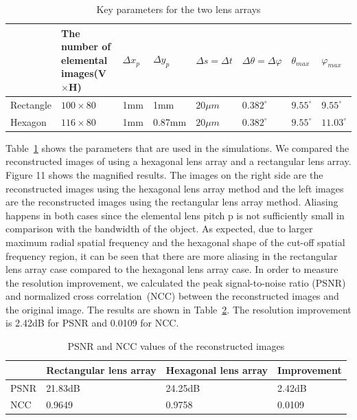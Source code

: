 \documentclass[10pt,letterpaper]{article}
\begin{document}
\begin{table}[htbp]
\centering\caption{ Key parameters for the two lens arrays}
\begin{tabular}{p{0.5in}|p{1.2in}|p{0.3in}|p{0.4in}|p{0.45in}|p{0.55in}|p{0.3in}|p{0.3in}} 
\hline 
  & The number of elemental images(V$\times$H) & $\Delta x_p$ & $\Delta y_p$ & $\Delta s=\Delta t$ & $\Delta\theta=\Delta\varphi$ & $\theta_{max}$ & $\varphi_{max}$ \\ \hline 
Rectangle  & $100\times 80$ & 1mm & 1mm & $20\mu m$ & $0.382^\circ$ & $9.55^\circ$ & $9.55^\circ$ \\ \hline 
Hexagon & $116\times 80$ & 1mm & 0.87mm & $20\mu m$ & $0.382^\circ$ & $9.55^\circ$ & $11.03^\circ$ \\ \hline 
\end{tabular}
\label{tb_2}
\end{table}
Table~\ref{tb_2} shows the parameters that are used in the simulations. We compared the reconstructed images of using a hexagonal lens array and a rectangular lens array. Figure 11 shows the magnified results. The images on the right side are the reconstructed images using the hexagonal lens array method and the left images are the reconstructed images using the rectangular lens array method. Aliasing happens in both cases since the elemental lens pitch p is not sufficiently small in comparison with the bandwidth of the object. As expected, due to larger maximum radial spatial frequency and the hexagonal shape of the cut-off spatial frequency region, it can be seen that there are more aliasing in the rectangular lens array case compared to the hexagonal lens array case. In order to measure the resolution improvement, we calculated the peak signal-to-noise ratio (PSNR) and normalized cross correlation~(NCC) between the reconstructed images and the original image. The results are shown in Table~\ref{tb_3}. The resolution improvement is 2.42dB for PSNR and 0.0109 for NCC. 
\begin{table}[htbp]
\centering\caption{PSNR and NCC values of the reconstructed images}
\begin{tabular}{p{0.4in}|p{1.3in}|p{1.2in}|p{0.7in}} \hline 
 & Rectangular lens array & Hexagonal lens array & Improvement \\ \hline 
PSNR & 21.83dB & 24.25dB & 2.42dB \\ \hline 
NCC & 0.9649 & 0.9758 & 0.0109 \\ \hline 
\end{tabular}
\label{tb_3}
\end{table}
\end{document}
